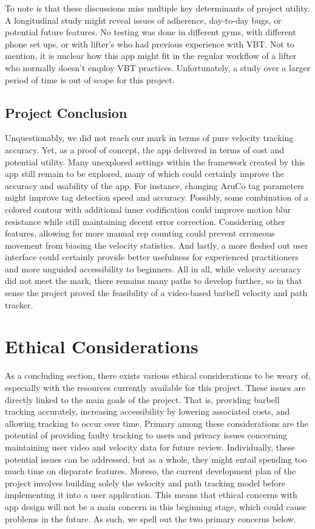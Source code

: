 \documentclass[10pt,twocolumn]{article}
\begin{document}
To note is that these discussions miss multiple key determinants of project utility.
A longitudinal study might reveal issues of adherence, day-to-day bugs, or potential future features.
No testing was done in different gyms, with different phone set ups, or with lifter's who had previous experience with VBT.
Not to mention, it is unclear how this app might fit in the regular workflow of a lifter who normally doesn't employ VBT practices.
Unfortunately, a study over a larger period of time is out of scope for this project. \par

\subsection{Project Conclusion}
Unquestionably, we did not reach our mark in terms of pure velocity tracking accuracy. 
Yet, as a proof of concept, the app delivered in terms of cost and potential utility.
Many unexplored settings within the framework created by this app still remain to be explored, many of which could certainly improve the accuracy and usability of the app.
For instance, changing AruCo tag parameters might improve tag detection speed and accuracy.
Possibly, some combination of a colored contour with additional inner codification could improve motion blur resistance while still maintaining decent error correction.
Considering other features, allowing for more manual rep counting could prevent erroneous movement from biasing the velocity statistics.
And lastly, a more fleshed out user interface could certainly provide better usefulness for experienced practitioners and more unguided accessibility to beginners.
All in all, while velocity accuracy did not meet the mark, there remains many paths to develop further, so in that sense the project proved the feasibility of a video-based barbell velocity and path tracker. \par
\section{Ethical Considerations}
As a concluding section, there exists various ethical considerations to be weary of, especially with the resources currently available for this project. 
These issues are directly linked to the main goals of the project. 
That is, providing barbell tracking accurately, increasing accessibility by lowering associated costs, and allowing tracking to occur over time. 
Primary among these considerations are the potential of providing faulty tracking to users and privacy issues concerning maintaining user video and velocity data for future review. 
Individually, these potential issues can be addressed, but as a whole, they might entail spending too much time on disparate features. 
Moreso, the current development plan of the project involves building solely the velocity and path tracking model before implementing it into a user application.
This means that ethical concerns with app design will not be a main concern in this beginning stage, which could cause problems in the future. 
As such, we spell out the two primary concerns below.
\end{document}
